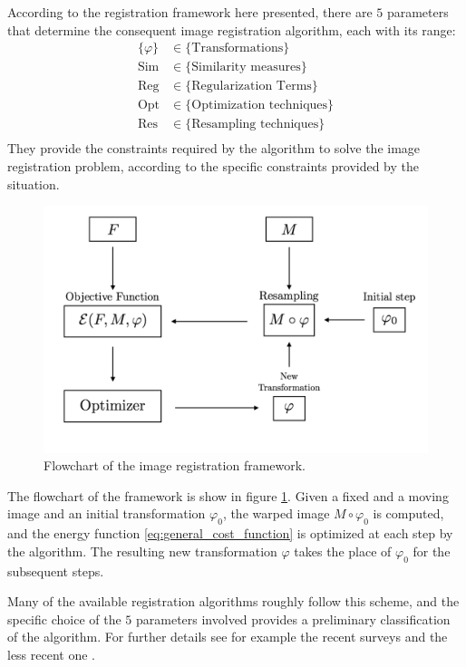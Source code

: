 According to the registration framework here presented, there are  $5$ parameters that determine the consequent image registration algorithm, each with its range:
\begin{align*}
\{  \varphi \} &\in \{ \text{Transformations}\}\\
\text{Sim} &\in \{ \text{Similarity measures}\}\\
\text{Reg} &\in \{ \text{Regularization Terms}\}\\
\text{Opt} &\in \{ \text{Optimization techniques}\}\\
\text{Res} &\in \{ \text{Resampling techniques}\}\\
\end{align*}
They provide the constraints required by the algorithm to solve the image registration problem, according to the specific constraints provided by the situation. 
\begin{figure}[!ht]
	\centering
	\includegraphics[scale=0.25]{figures/iterative_algorithm.pdf}
	\caption{Flowchart of the image registration framework.}
	\label{fig:iterative_algorithm_scheme}
\end{figure}
The flowchart of the framework is show in figure \ref{fig:iterative_algorithm_scheme}. Given a fixed and a moving image and an initial transformation $\varphi_0$, the warped image $M\circ\varphi_{0}$ is computed, and the 
energy function \ref{eq:general_cost_function} is optimized at each step by the algorithm. The resulting new transformation $\varphi$ takes the place of $\varphi_0$ for the subsequent steps.

Many of the available registration algorithms roughly follow this scheme, and the specific choice of the $5$ parameters involved provides a preliminary classification of the algorithm.
For further details see for example the recent surveys \cite{Sotiras:survey:13} and the less recent one \cite{zitova2003image}. 

